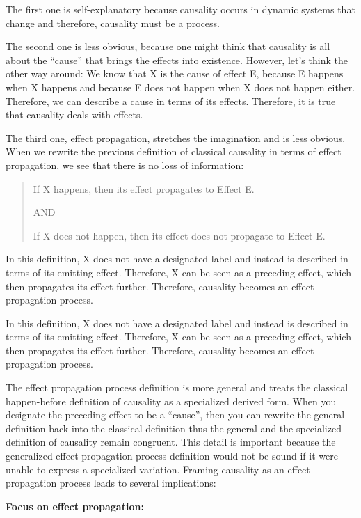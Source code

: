\documentclass{article}
\begin{document}
The first one is self-explanatory because causality occurs in dynamic systems that change and therefore, causality must be a process.

The second one is less obvious, because one might think that causality is all about the “cause” that brings the effects into existence. However, let’s think the other way around: We know that X is the cause of effect E, because E happens when X happens and because E does not happen when X does not happen either. Therefore, we can describe a cause in terms of its effects. Therefore, it is true that causality deals with effects.

The third one, effect propagation, stretches the imagination and is less obvious. When we rewrite the previous definition of classical causality in terms of effect propagation, we see that there is no loss of information:

\begin{quote}
    If X happens, then its effect propagates to Effect E.

    AND
    
    If X does not happen, then its effect does not propagate to Effect E.
\end{quote}

In this definition, X does not have a designated label and instead is described in terms of its emitting effect. Therefore, X can be seen as a preceding effect, which then propagates its effect further. Therefore, causality becomes an effect propagation process. 

In this definition, X does not have a designated label and instead is described in terms of its emitting effect. Therefore, X can be seen as a preceding effect, which then propagates its effect further. Therefore, causality becomes an effect propagation process.

The effect propagation process definition is more general and treats the classical happen-before definition of causality as a specialized derived form. When you designate the preceding effect to be a “cause”, then you can rewrite the general definition back into the classical definition thus the general and the specialized definition of causality remain congruent. This detail is important because the generalized effect propagation process definition would not be sound if it were unable to express a specialized variation. Framing causality as an effect propagation process leads to several implications:


\textbf{Focus on effect propagation:}
\end{document}
